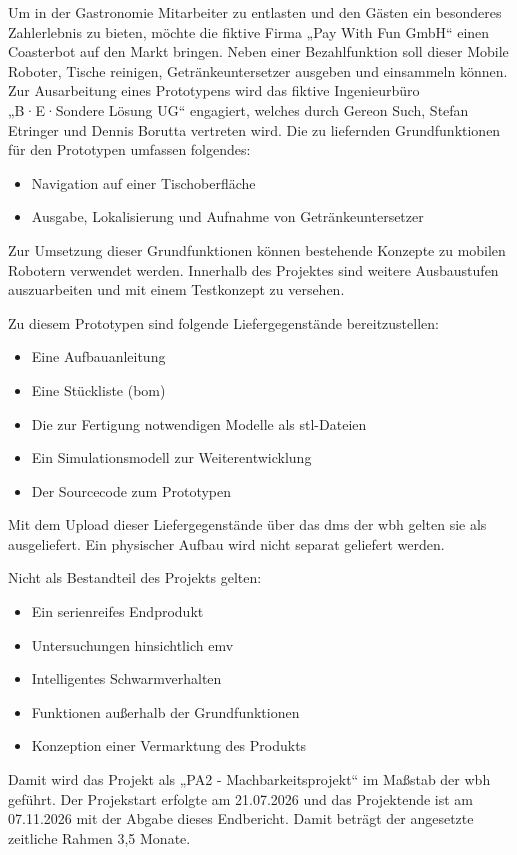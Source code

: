 Um in der Gastronomie Mitarbeiter zu entlasten und den Gästen ein besonderes Zahlerlebnis zu bieten, möchte die fiktive Firma
„Pay With Fun GmbH`` einen Coasterbot auf den Markt bringen. Neben einer Bezahlfunktion soll dieser Mobile Roboter, Tische reinigen,
Getränkeuntersetzer ausgeben und einsammeln können.
Zur Ausarbeitung eines Prototypens wird das fiktive Ingenieurbüro „B·E·Sondere Lösung UG`` engagiert, welches durch Gereon Such, Stefan Etringer und Dennis Borutta vertreten wird.
Die zu liefernden Grundfunktionen für den Prototypen umfassen folgendes:
\begin{itemize}
    \item Navigation auf einer Tischoberfläche
    \item Ausgabe, Lokalisierung und Aufnahme von Getränkeuntersetzer
\end{itemize}
Zur Umsetzung dieser Grundfunktionen können bestehende Konzepte zu mobilen Robotern verwendet werden.
Innerhalb des Projektes sind weitere Ausbaustufen auszuarbeiten und mit einem Testkonzept zu versehen.

Zu diesem Prototypen sind folgende Liefergegenstände bereitzustellen:
\begin{itemize}
    \item Eine Aufbauanleitung
    \item Eine Stückliste (\gls{bom})
    \item Die zur Fertigung notwendigen Modelle als stl-Dateien
    \item Ein Simulationsmodell zur Weiterentwicklung
    \item Der Sourcecode zum Prototypen
\end{itemize}
Mit dem Upload dieser Liefergegenstände über das \gls{dms} 
der \gls{wbh} gelten sie als ausgeliefert. 
Ein physischer Aufbau wird nicht separat geliefert werden. 

Nicht als Bestandteil des Projekts gelten:
\begin{itemize}
    \item Ein serienreifes Endprodukt
    \item Untersuchungen hinsichtlich \gls{emv}
    \item Intelligentes Schwarmverhalten
    \item Funktionen außerhalb der Grundfunktionen
    \item Konzeption einer Vermarktung des Produkts
\end{itemize}

Damit wird das Projekt als „PA2 - Machbarkeitsprojekt`` im Maßstab der \gls{wbh} geführt.
Der Projekstart erfolgte am 21.07.2026 und das Projektende ist am 07.11.2026 mit der Abgabe dieses Endbericht. 
Damit beträgt der angesetzte zeitliche Rahmen 3,5 Monate. 
